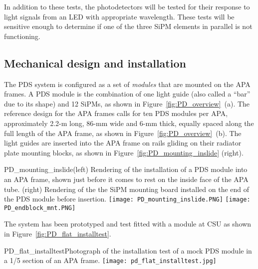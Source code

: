 In addition to these tests, the photodetectors will be tested for their
response to light signals from an LED with appropriate wavelength.
These tests will be sensitive enough to determine if one of the three SiPM
elements in parallel is not functioning.


\subsection{Mechanical design and installation}

The PDS system is configured as a set of \textit{modules} that are mounted on the APA frames.  A PDS module is
the combination of one light guide (also called a ``bar'' due to its
shape) and 12 SiPMs, as shown in Figure~\ref{fig:PD_overview}~(a). 
The reference design for the APA frames calls for ten PDS modules per APA, approximately 2.2-m long,
86-mm wide and 6-mm thick, equally spaced along the full length of the
APA frame, as shown in Figure~\ref{fig:PD_overview}~(b). 
The light guides are inserted into the APA frame on rails gliding on their radiator
plate mounting blocks, as shown in Figure~\ref{fig:PD_mounting_inslide} (right). 

\begin{cdrfigure}
  {PD_mounting_inslide}{(left) Rendering of the installation of a PDS module
    into an APA frame, shown just before it comes to rest on the inside face
    of the APA tube. (right) Rendering of the the SiPM mounting board
    installed on the end of the PDS module before insertion.}
\texttt{[image: PD\_mounting\_inslide.PNG]}
\texttt{[image: PD\_endblock\_mnt.PNG]}
\end{cdrfigure}
%


The system has been prototyped and test fitted with a module at CSU 
as shown in Figure~\ref{fig:PD_flat_installtest}.
\begin{cdrfigure}
  {PD_flat_installtest}{Photograph of the installation
    test of a mock PDS module in a 1/5 section of an APA frame.}
\texttt{[image: pd\_flat\_installtest.jpg]}
\end{cdrfigure}

